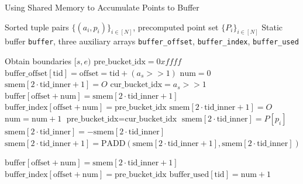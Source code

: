 \documentclass[conference]{IEEEtran}
\begin{document}
\begin{algorithm}
    \caption{Using Shared Memory to Accumulate Points to Buffer}
    \label{alg:shared-memory-accumulation}
    \begin{algorithmic}[1]
    \REQUIRE Sorted tuple pairs $\{(a_i, p_i)\}_{i \in [N]}$, precomputed point set $\{P_i\}_{i \in [N]}$
    \ENSURE Static buffer \texttt{buffer}, three auxiliary arrays \texttt{buffer\_offset}, \texttt{buffer\_index}, \texttt{buffer\_used}
    
    \STATE Obtain boundaries $[s, e)$
    \STATE $\text{pre\_bucket\_idx} = 0xffff$ 
    \STATE $\text{buffer\_offset}[\text{tid}] = \text{offset} = \text{tid} + (a_s >> 1)$
    \STATE $\text{num} = 0$
    \STATE $\text{smem}[2 \cdot \text{tid\_inner} + 1] = O$ 
        \STATE $\text{cur\_bucket\_idx} = a_s >> 1$
            \STATE $\text{buffer}[\text{offset} + \text{num}] = \text{smem}[2 \cdot \text{tid\_inner} + 1]$
            \STATE $\text{buffer\_index}[\text{offset} + \text{num}] = \text{pre\_bucket\_idx}$
            \STATE $\text{smem}[2 \cdot \text{tid\_inner} + 1] = O$
            \STATE $\text{num} = \text{num} + 1$
        \ENDIF
        \STATE $\text{pre\_bucket\_idx} = \text{cur\_bucket\_idx}$
        \STATE $\text{smem}[2 \cdot \text{tid\_inner}] = P[p_i]$ 
            \STATE $\text{smem}[2 \cdot \text{tid\_inner}] = -\text{smem}[2 \cdot \text{tid\_inner}]$
        \ENDIF
        \STATE $\text{smem}[2 \cdot \text{tid\_inner} + 1] = \text{PADD}(\text{smem}[2 \cdot \text{tid\_inner} + 1], \text{smem}[2 \cdot \text{tid\_inner}])$
    \ENDFOR
    
    \STATE $\text{buffer}[\text{offset} + \text{num}] = \text{smem}[2 \cdot \text{tid\_inner} + 1]$
    \STATE $\text{buffer\_index}[\text{offset} + \text{num}] = \text{pre\_bucket\_idx}$
    \STATE $\text{buffer\_used}[\text{tid}] = \text{num} + 1$
\end{algorithmic}
\end{algorithm}
\end{document}
